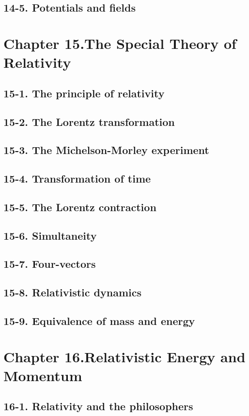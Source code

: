 \documentclass{article}
\begin{document}
\subsection{14-5. Potentials and fields}
\section{Chapter 15.The Special Theory of Relativity}
\subsection{15-1. The principle of relativity}
\subsection{15-2. The Lorentz transformation}
\subsection{15-3. The Michelson-Morley experiment}
\subsection{15-4. Transformation of time}
\subsection{15-5. The Lorentz contraction}
\subsection{15-6. Simultaneity}
\subsection{15-7. Four-vectors}
\subsection{15-8. Relativistic dynamics}
\subsection{15-9. Equivalence of mass and energy}
\section{Chapter 16.Relativistic Energy and Momentum}
\subsection{16-1. Relativity and the philosophers}
\end{document}
